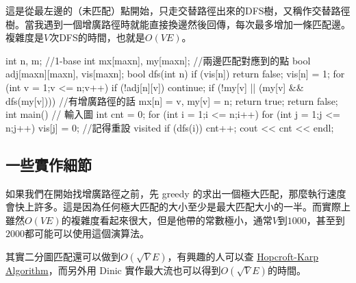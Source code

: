 這是從最左邊的（未匹配）點開始，只走交替路徑出來的DFS樹，又稱作交替路徑樹。當我遇到一個增廣路徑時就能直接換邊然後回傳，每次最多增加一條匹配邊。複雜度是$V$次DFS的時間，也就是$O(VE)$。
\begin{C++}
int n, m; //1-base
int mx[maxn], my[maxn]; //兩邊匹配對應到的點
bool adj[maxn][maxn], vis[maxn];
bool dfs(int n) {
	if (vis[n]) return false;
	vis[n] = 1;
	for (int v = 1;v <= n;v++) {
		if (!adj[n][v]) continue;
		if (!my[v] || (my[v] && dfs(my[v]))) { //有增廣路徑的話
			mx[n] = v, my[v] = n;
			return true;
		}
	}
	return false;
}
int main() {
	// 輸入圖
	int cnt = 0;
	for (int i = 1;i <= n;i++) {
		for (int j = 1;j <= n;j++) vis[j] = 0; //記得重設 visited
		if (dfs(i)) {
			cnt++;
		}
	}
    cout << cnt << endl;
}
\end{C++}
\subsection{一些實作細節}
\par 如果我們在開始找增廣路徑之前，先 greedy 的求出一個極大匹配，那麼執行速度會快上許多。這是因為任何極大匹配的大小至少是最大匹配大小的一半。而實際上雖然$O(VE)$的複雜度看起來很大，但是他帶的常數極小，通常$V$到$1000$，甚至到$2000$都可能可以使用這個演算法。

\par 其實二分圖匹配還可以做到$O(\sqrt{V} E)$，有興趣的人可以查 \href{https://en.wikipedia.org/wiki/Hopcroft-Karp_algorithm}{Hopcroft-Karp Algorithm}，而另外用 Dinic 實作最大流也可以得到$O(\sqrt{V} E)$的時間。


